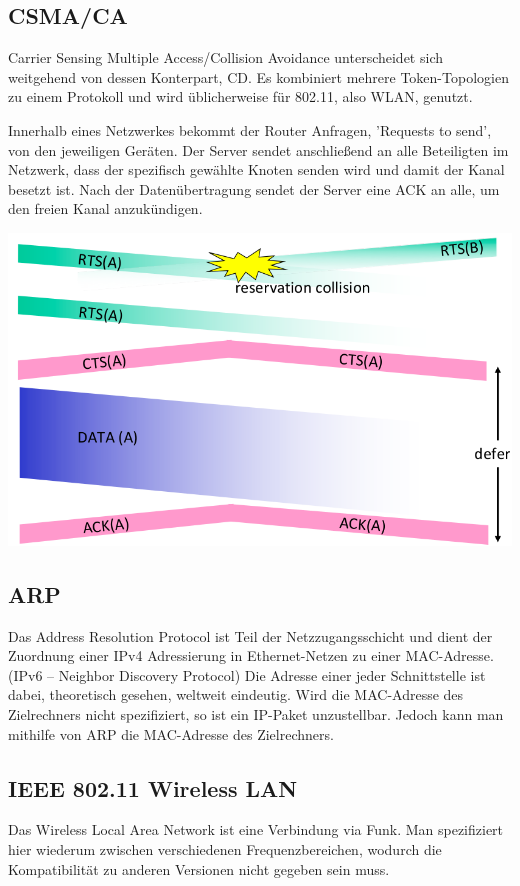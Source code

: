 \documentclass{scrartcl}
\begin{document}
    \subsection{CSMA/CA}
    Carrier Sensing Multiple Access/Collision Avoidance unterscheidet sich weitgehend von dessen Konterpart, CD.
    Es kombiniert mehrere Token-Topologien zu einem Protokoll und wird üblicherweise für 802.11, also WLAN, genutzt.
    
    Innerhalb eines Netzwerkes bekommt der Router Anfragen, 'Requests to send', von den jeweiligen Geräten. Der Server sendet anschließend an alle Beteiligten im Netzwerk, dass der spezifisch gewählte Knoten senden wird und damit der Kanal besetzt ist. Nach der Datenübertragung sendet der Server eine ACK an alle, um den freien Kanal anzukündigen.
    \begin{center}
        \includegraphics[width=\textwidth]{CSMACA.png}
    \end{center}

    \subsection{ARP}
    Das Address Resolution Protocol ist Teil der Netzzugangsschicht und dient der Zuordnung einer IPv4 Adressierung in Ethernet-Netzen zu einer MAC-Adresse. (IPv6 -- Neighbor Discovery Protocol)
    Die Adresse einer jeder Schnittstelle ist dabei, theoretisch gesehen, weltweit eindeutig. Wird die MAC-Adresse des Zielrechners nicht spezifiziert, so ist ein IP-Paket unzustellbar. Jedoch kann man mithilfe von ARP die MAC-Adresse des Zielrechners.
    
    \subsection{IEEE 802.11 Wireless LAN}
    Das Wireless Local Area Network ist eine Verbindung via Funk. Man spezifiziert hier wiederum zwischen verschiedenen Frequenzbereichen, wodurch die Kompatibilität zu anderen Versionen nicht gegeben sein muss.
    
\end{document}
